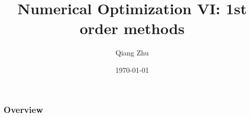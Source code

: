 \documentclass{beamer}
\title[Gradient Descent]{Numerical Optimization VI: 1st order methods} %
\author{Qiang Zhu} %
\institute[University of Nevada Las Vegas] %
{
University of Nevada Las Vegas\\ %
\medskip
}
\date{\today} %
\begin{document}
\begin{frame}
\titlepage %
\end{frame}

\begin{frame}
\frametitle{Overview} %
\tableofcontents %
\end{frame}


\end{document}
